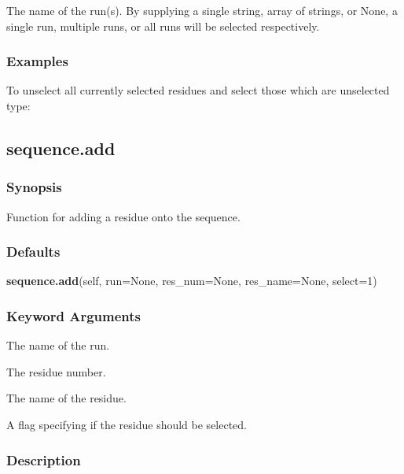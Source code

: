    The name of the run(s).  By supplying a single string, array of strings, or None, a single run, multiple runs, or all runs will be selected respectively.  

  

  
 \subsubsection{Examples} 

 To unselect all currently selected residues and select those which are unselected type: 
  


  

 \newpage 

 \subsection{sequence.add} 

  
 \subsubsection{Synopsis} 

 Function for adding a residue onto the sequence. 
  

  
 \subsubsection{Defaults} 

 \textsf{\textbf{sequence.add}(self, run=None, res\_num=None, res\_name=None, select=1)} 

  
 \subsubsection{Keyword Arguments} 

   The name of the run.   

   The residue number.   

   The name of the residue.   

   A flag specifying if the residue should be selected.  

  

  
 \subsubsection{Description} 

